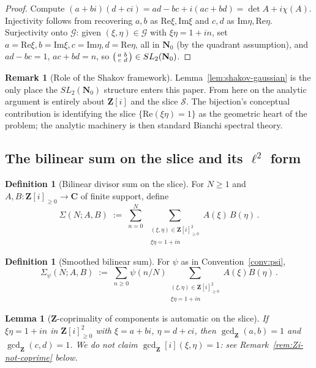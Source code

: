 \documentclass[11pt]{article}
\newtheorem{lemma}[theorem]{Lemma}
\theoremstyle{definition}
\newtheorem{definition}[theorem]{Definition}
\newtheorem{remark}[theorem]{Remark}
\newcommand{\Nz}{\mathbf{N}_0}
\newcommand{\Z}{\mathbf{Z}}
\newcommand{\C}{\mathbf{C}}
\newcommand{\Zi}{\Z[i]}
\renewcommand{\Re}{\mathrm{Re}}
\renewcommand{\Im}{\mathrm{Im}}
\begin{document}
\begin{proof}
Compute $(a+bi)(d+ci)=ad-bc+i(ac+bd)=\det A+i\chi(A)$. Injectivity follows from recovering $a,b$ as $\Re\xi,\Im\xi$ and $c,d$ as $\Im\eta,\Re\eta$. Surjectivity onto $\mathcal G$: given $(\xi,\eta)\in\mathcal G$ with $\xi\eta=1+in$, set $a=\Re\xi,b=\Im\xi,c=\Im\eta,d=\Re\eta$, all in $\Nz$ (by the quadrant assumption), and $ad-bc=1$, $ac+bd=n$, so $\begin{psmallmatrix}a&b\\c&d\end{psmallmatrix}\in SL_2(\Nz)$.
\end{proof}

\begin{remark}[Role of the Shakov framework]\label{rem:shakov-role}
Lemma~\ref{lem:shakov-gaussian} is the only place the $SL_2(\Nz)$ structure enters this paper. From here on the analytic argument is entirely about $\Zi$ and the slice $\mathcal S$. The bijection's conceptual contribution is identifying the slice $\{\Re(\xi\eta)=1\}$ as the geometric heart of the problem; the analytic machinery is then standard Bianchi spectral theory.
\end{remark}

\subsection{The bilinear sum on the slice and its $\ell^2$ form}\label{ssec:bilinear-sum}

\begin{definition}[Bilinear divisor sum on the slice]\label{def:Sigma}
For $N\ge 1$ and $A,B:\Zi_{\ge 0}\to\C$ of finite support, define
\[
   \Sigma(N;A,B)\;:=\;\sum_{n=0}^N\;\sum_{\substack{(\xi,\eta)\in\Zi_{\ge 0}^2\\\xi\eta=1+in}}A(\xi)\,B(\eta)\,.
\]
\end{definition}

\begin{definition}[Smoothed bilinear sum]\label{def:Sigma-psi}
For $\psi$ as in Convention~\ref{conv:psi},
\[
   \Sigma_\psi(N;A,B)\;:=\;\sum_{n\ge 0}\psi(n/N)\sum_{\substack{(\xi,\eta)\in\Zi_{\ge 0}^2\\\xi\eta=1+in}}A(\xi)B(\eta)\,.
\]
\end{definition}

\begin{lemma}[$\Z$-coprimality of components is automatic on the slice]\label{lem:coprime}
If $\xi\eta=1+in$ in $\Zi_{\ge 0}^2$ with $\xi=a+bi$, $\eta=d+ci$, then $\gcd_\Z(a,b)=1$ and $\gcd_\Z(c,d)=1$. \emph{We do not claim $\gcd_\Zi(\xi,\eta)=1$}: see Remark~\ref{rem:Zi-not-coprime} below.
\end{lemma}
\end{document}
